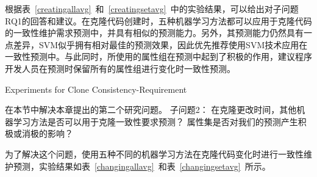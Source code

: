 根据表~\ref{creatingallavg}~和~\ref{creatingsetavg}~中的实验结果，可以给出对子问题RQ1的回答和建议。在克隆代码创建时，五种机器学习方法都可以应用于克隆代码的一致性维护需求预测中，并具有相似的预测能力。另外，其预测能力仍然具有一点差异，SVM似乎拥有相对最佳的预测效果，因此优先推荐使用SVM技术应用在一致性预测中。与此同时，所使用的属性组在预测中起到了积极的作用，建议程序开发人员在预测时保留所有的属性组进行变化时一致性预测。


{Experiments for Clone Consistency-Requirement}

在本节中解决本章提出的第二个研究问题。
子问题2：
在克隆更改时间，其他机器学习方法是否可以用于克隆一致性要求预测？
属性集是否对我们的预测产生积极或消极的影响？


为了解决这个问题，使用五种不同的机器学习方法在克隆代码变化时进行一致性维护预测，实验结果如表~\ref{changingallavg}~和表~\ref{changingsetavg}~所示。


